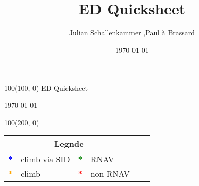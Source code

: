 \documentclass[10pt,landscape,a4paper]{article}
\title{ED Quicksheet}
\author{Julian Schallenkammer ,Paul à Brassard}
\date{\today}
\begin{document}
\setlength\extrarowheight{1pt}

\setlength{\TPHorizModule}{1mm}
\setlength{\TPVertModule}{\TPHorizModule}
\textblockorigin{7mm}{12mm}


\begin{textblock}{100}(100, 0)
  \large
  \centering
  ED Quicksheet

  \today
\end{textblock}

\begin{textblock}{100}(200, 0)
\begin{table}[]
\begin{tabular}{|llllll}
\multicolumn{4}{c}{\textbf{Legnde}} \\ \hline
\multicolumn{1}{|l|}{\textbf{\textcolor{blue}{*}}} 				& \multicolumn{1}{c|}{climb via SID} 	& \multicolumn{1}{|l|}{\textbf{\textcolor{green}{*}}}				& \multicolumn{1}{l|}{RNAV }			\\ \hline
\multicolumn{1}{|l|}{\textbf{\textcolor{orange}{*}}}			& \multicolumn{1}{l|}{climb }		& \multicolumn{1}{|l|}{\textbf{\textcolor{red}{*}}}						& \multicolumn{1}{l|}{non-RNAV }	\\ \hline
		

\end{tabular}
\end{table}
\end{textblock}
\end{document}
